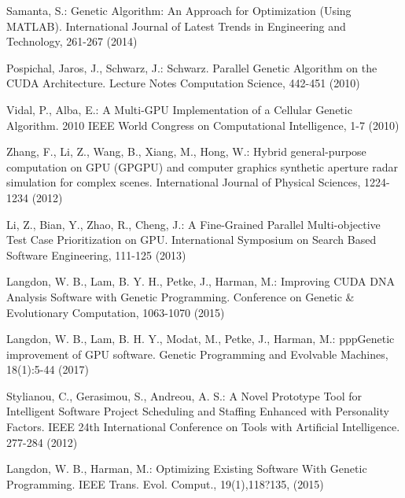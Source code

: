 \begin{thebibliography}{}
Samanta, S.:
Genetic Algorithm: An Approach for Optimization (Using MATLAB). 
International Journal of Latest Trends in Engineering and Technology, 261-267 (2014)

Pospichal, Jaros, J., Schwarz, J.:
Schwarz. Parallel Genetic Algorithm on the CUDA Architecture.
Lecture Notes Computation Science, 442-451 (2010)

Vidal, P., Alba, E.:
A Multi-GPU Implementation of a Cellular Genetic Algorithm.
2010 IEEE World Congress on Computational Intelligence, 1-7 (2010)

Zhang, F., Li, Z., Wang, B., Xiang, M., Hong, W.:
Hybrid general-purpose computation on GPU (GPGPU) and computer graphics synthetic aperture radar simulation for complex scenes.
International Journal of Physical Sciences, 1224-1234 (2012)

Li, Z., Bian, Y., Zhao, R., Cheng, J.:
A Fine-Grained Parallel Multi-objective Test Case Prioritization on GPU.
International Symposium on Search Based Software Engineering, 111-125 (2013)

Langdon, W. B., Lam, B. Y. H., Petke, J., Harman, M.:
Improving CUDA DNA Analysis Software with Genetic Programming.
Conference on Genetic \& Evolutionary Computation, 1063-1070 (2015)

Langdon, W. B., Lam, B. H. Y., Modat, M., Petke, J., Harman, M.:
pppGenetic improvement of GPU software.
Genetic Programming and Evolvable Machines, 18(1):5-44 (2017)

Stylianou, C., Gerasimou, S., Andreou, A. S.:
A Novel Prototype Tool for Intelligent Software 
Project Scheduling and Staffing Enhanced with Personality Factors.
IEEE 24th International Conference on Tools with Artificial Intelligence. 277-284 (2012)

Langdon, W. B., Harman, M.:
Optimizing Existing Software With Genetic Programming.
IEEE Trans. Evol. Comput., 19(1),118?135, (2015)



















\end{thebibliography}
